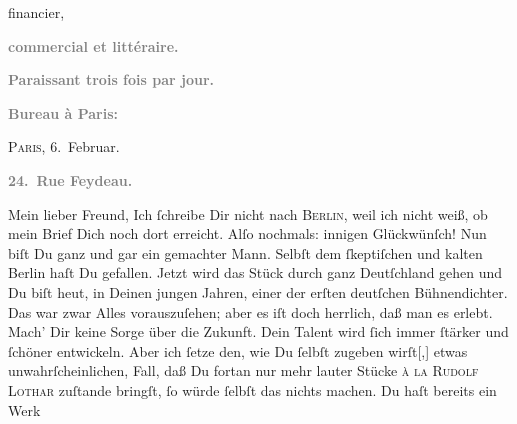 \begin{ledgroupsized}[t]{13cm}
\begin{otherlanguage}{french}
{{                        financier,}}\end{otherlanguage}\pend
           \pstart
           \begin{otherlanguage}{french}\textcolor{gray}{\textbf{commercial et littéraire.}}\end{otherlanguage}\pend
           \pstart
           \begin{otherlanguage}{french}\textcolor{gray}{\textbf{\textbf{Paraissant trois fois par jour.}}}\end{otherlanguage}\pend
           \pstart
           \begin{otherlanguage}{french}\textcolor{gray}{\textbf{\textbf{Bureau à Paris:}}}\end{otherlanguage}\hfill \textsc{Paris}, 6. Februar.\pend
           \pstart
           \begin{otherlanguage}{french}\textcolor{gray}{\textbf{\textbf{24. Rue Feydeau.}}}\end{otherlanguage}\pend
           \pstart\center{}Mein lieber Freund,\pend\pstart
           Ich ſchreibe Dir nicht nach \textsc{Berlin}, weil ich nicht weiß, ob mein Brief Dich noch dort erreicht.\pend
           \pstart
           Alſo nochmals: innigen Glückwünſch! Nun biſt Du ganz und gar ein gemachter Mann.
               Selbſt dem ſkeptiſchen und kalten Berlin haſt Du
               gefallen. Jetzt wird das Stück
               durch ganz Deutſchland gehen\strikeout{,} und Du biſt heut, in Deinen jungen Jahren, einer der
               erſten deutſchen Bühnendichter. {\pb}Das war zwar Alles
               vorauszuſehen; aber es iſt doch herrlich, daß man es  erleb\strikeout{\textcolor{gray}{e}}t. Mach’ Dir keine Sorge über die Zukunft. Dein Talent wird ſich immer ſtärker
               und ſchöner entwickeln. Aber ich ſetze den, wie Du ſelbſt zugeben
                  wirſt{[},{]} etwas unwahrſcheinlichen, Fall, daß  Du fortan nur mehr lauter Stücke \textsc{à la}{ }\textsc{Rudolf Lothar} zuſtande bringſt, ſo würde ſelbſt das nichts machen. Du haſt bereits ein Werk

\end{ledgroupsized}
